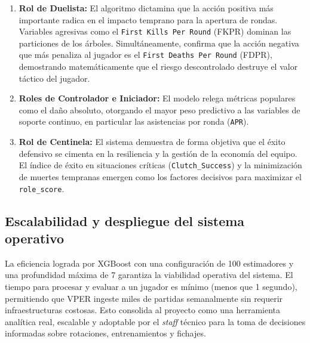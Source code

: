\documentclass{ULBreport} %
\begin{document}
\begin{itemize}
\begin{enumerate}
    \item \textbf{Rol de Duelista:} El algoritmo dictamina que la acción positiva más importante radica en el impacto temprano para la apertura de rondas. Variables agresivas como el \texttt{First Kills Per Round} (FKPR) dominan las particiones de los árboles. Simultáneamente, confirma que la acción negativa que más penaliza al jugador es el \texttt{First Deaths Per Round} (FDPR), demostrando matemáticamente que el riesgo descontrolado destruye el valor táctico del jugador.
    \item \textbf{Roles de Controlador e Iniciador:} El modelo relega métricas populares como el daño absoluto, otorgando el mayor peso predictivo a las variables de soporte continuo, en particular las asistencias por ronda (\texttt{APR}).
    \item \textbf{Rol de Centinela:} El sistema demuestra de forma objetiva que el éxito defensivo se cimenta en la resiliencia y la gestión de la economía del equipo. El índice de éxito en situaciones críticas (\texttt{Clutch\_Success}) y la minimización de muertes tempranas emergen como los factores decisivos para maximizar el \texttt{role\_score}.
\end{enumerate}

\subsection{Escalabilidad y despliegue del sistema operativo}

La eficiencia lograda por XGBoost con una configuración de 100 estimadores y una profundidad máxima de 7 garantiza la viabilidad operativa del sistema. El tiempo para procesar y evaluar a un jugador es mínimo (menos que 1 segundo), permitiendo que VPER ingeste miles de partidas semanalmente sin requerir infraestructuras costosas. Esto consolida al proyecto como una herramienta analítica real, escalable y adoptable por el \textit{staff} técnico para la toma de decisiones informadas sobre rotaciones, entrenamientos y fichajes.
    
\end{itemize}
\end{document}
